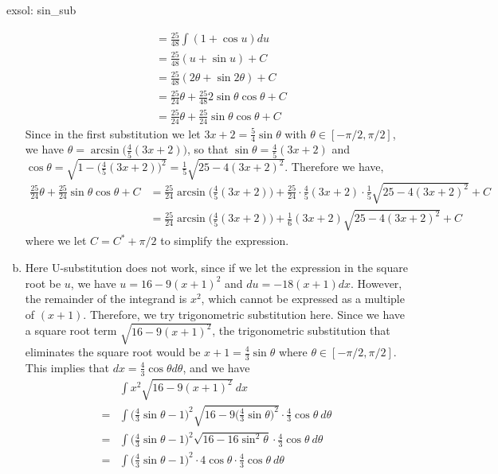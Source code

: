 \begin{exsol}[]{exsol: sin_sub}
\begin{enumerate}[a)]
\begin{align*}
            &= \frac{25}{48} \int (1+\cos u)du\\
            &= \frac{25}{48} (u+\sin u) + C\\
            &= \frac{25}{48} (2\theta + \sin 2\theta) + C\\
            &= \frac{25}{24} \theta + \frac{25}{48} 2\sin \theta \cos \theta + C\\
            &= \frac{25}{24} \theta + \frac{25}{24} \sin \theta \cos \theta + C
        \end{align*}
        Since in the first substitution we let $3x + 2 = \frac{5}{4}\sin \theta$ with $\theta \in [-\pi/2, \pi/2]$, we have $\theta = \arcsin\big(\frac{4}{5}(3x + 2)\big)$, so that $\sin \theta = \frac{4}{5} (3x+2)$ and $\cos \theta = \sqrt{1-\big(\frac{4}{5}(3x +2)\big)^2} = \frac{1}{5}\sqrt{25 - 4(3x+2)^2}$.  Therefore we have,
        \begin{align*}
            \frac{25}{24} \theta + \frac{25}{24} \sin \theta \cos \theta + C &= \frac{25}{24} \arcsin\Big(\frac{4}{5}(3x + 2)\Big) + \frac{25}{24} \cdot \frac{4}{5} (3x+2) \cdot \frac{1}{5}\sqrt{25 - 4(3x+2)^2} + C\\
            &= \frac{25}{24} \arcsin\Big(\frac{4}{5}(3x + 2)\Big) + \frac{1}{6}(3x+2)\sqrt{25 - 4(3x+2)^2} + C
        \end{align*}
        where we let $C = C^* + \pi/2$ to simplify the expression.
        \item Here U-substitution does not work, since if we let the expression in the square root be $u$, we have $u = 16-9(x+1)^2$ and $du = -18(x+1)dx$.  However, the remainder of the integrand is $x^2$, which cannot be expressed as a multiple of $(x+1)$.  Therefore, we try trigonometric substitution here.  Since we have a square root term $\sqrt{16-9(x+1)^2}$, the trigonometric substitution that eliminates the square root would be $x+1 = \frac{4}{3}\sin \theta$ where $\theta \in [-\pi/2, \pi/2]$.  This implies that $dx = \frac{4}{3}\cos\theta d\theta$, and we have
        \begin{align*}
            &\int x^2\sqrt{16-9(x+1)^2}~dx\\
            =&\int \Big(\frac{4}{3}\sin\theta-1\Big)^2\sqrt{16-9\Big(\frac{4}{3}\sin\theta\Big)^2} \cdot \frac{4}{3}\cos\theta~d\theta\\
            =&\int \Big(\frac{4}{3}\sin\theta-1\Big)^2\sqrt{16-16\sin^2\theta} \cdot \frac{4}{3}\cos\theta~ d\theta\\
            =&\int \Big(\frac{4}{3}\sin\theta-1\Big)^2 \cdot 4 \cos \theta \cdot \frac{4}{3}\cos\theta~ d\theta\\

\end{align*}
\end{enumerate}
\end{exsol}

